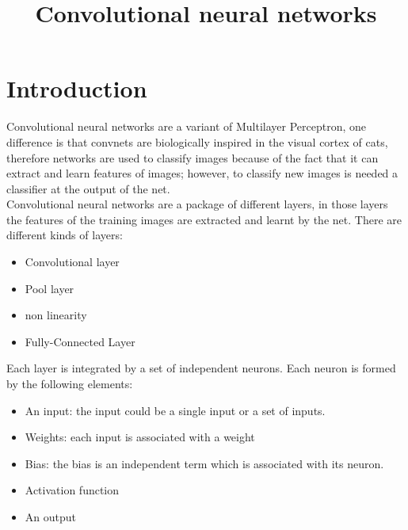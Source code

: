 \documentclass[a4paper]{article}
\begin{document}
\title{Convolutional neural networks}
\maketitle

\section{Introduction}
Convolutional neural networks are a variant of Multilayer Perceptron, one difference is that convnets are biologically inspired in the visual cortex of cats, therefore networks are used to classify images because of the fact that it can extract and learn features of images; however, to classify new images is needed a classifier at the output of the net.\\

Convolutional neural networks are a package of different layers, in those layers the features of the training images are extracted and learnt by the net. There are different kinds of layers:
\begin{itemize}
	\item Convolutional layer
	\item Pool layer
	\item non linearity
	\item Fully-Connected Layer
\end{itemize}

Each layer is integrated by a set of independent neurons.  Each neuron is formed by the following elements:\\

\begin{itemize}
	\item An input: the input could be a single input or a set of inputs.
	\item Weights: each input is associated with a weight
	\item Bias:  the bias is an independent term which is associated with its neuron.
	\item Activation function
	\item An output
\end{itemize}
\end{document}
